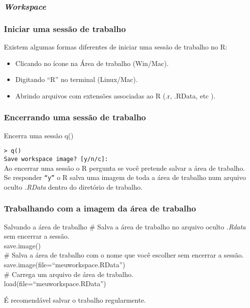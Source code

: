 \documentclass[handout]{beamer}
\begin{document}
\begin{frame}
  \frametitle{\textit{Workspace}}
  \begin{center}
  \end{center}
\end{frame}
\begin{frame}
  \frametitle{Iniciar uma sessão de trabalho}
  Existem algumas formas diferentes de iniciar uma sessão de trabalho no R:
  \begin{itemize}
    \item Clicando no ícone na Área de trabalho (Win/Mac).
    \item Digitando ``R'' no terminal (Linux/Mac).
    \item Abrindo arquivos com extensões associadas ao R (.r, .RData, etc
).
  \end{itemize}
  \begin{center}
  \end{center}
\end{frame}
 
\begin{frame}
  \frametitle{Encerrando uma sessão de trabalho}
  \begin{block}{Encerra uma sessão}
    q()
  \end{block}
\texttt{> q()\\
Save workspace image? [y/n/c]:}
\vspace{10pt}\\
Ao encerrar uma sessão o R pergunta se você pretende salvar a área de trabalho. Se responder \texttt{``y''} o R salva uma imagem de toda a área de trabalho num arquivo oculto \textit{.RData} dentro do diretório de trabalho.
\end{frame}
\begin{frame}
  \frametitle{Trabalhando com a imagem da área de trabalho}
  \begin{block}{Salvando a área de trabalho}
    \# Salva a área de trabalho no arquivo oculto \textit{.Rdata} sem encerrar a sessão. \\
     save.image()\\
    \vspace{10pt}
    \#  Salva a área de trabalho com o nome que você escolher  sem encerrar a sessão.\\
     save.image(file=``meuworkspace.RData'')\\
 \vspace{10pt}
   \# Carrega um arquivo de área de trabalho. \\
    load(file=``meuworkspace.RData'')
  \end{block}
 É recomendável salvar o trabalho  regularmente.  
\end{frame}
\end{document}
